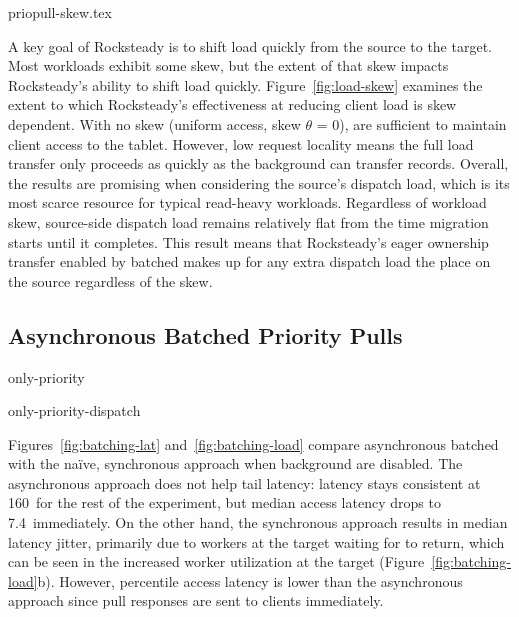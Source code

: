 

%

 {priopull-skew.tex}

A key goal of Rocksteady is to shift load quickly from the source to the
target. Most workloads exhibit some skew, but the extent of that skew impacts
Rocksteady's ability to shift load quickly. Figure~\ref{fig:load-skew}
examines the extent to which Rocksteady's effectiveness at reducing client load
is skew dependent. With no skew (uniform access, skew $\theta$ = 0), \priopulls are
sufficient to maintain client access to the tablet. However, low request locality
means the full load transfer only proceeds as quickly as the background
\pulls
can transfer records.  Overall, the results are promising when considering the
source's dispatch load, which is its most scarce resource for typical
read-heavy workloads. Regardless of workload skew, source-side dispatch load
remains relatively flat from the time migration starts until it completes.
This result means that Rocksteady's eager ownership transfer enabled by
batched \priopulls makes up for any extra dispatch load the \pulls place
on the source regardless of the skew.


\subsection{Asynchronous Batched Priority Pulls}
\label{sec:eval-priopulls}

 {only-priority}

 {only-priority-dispatch}

Figures~\ref{fig:batching-lat} and~\ref{fig:batching-load} compare
asynchronous batched \priopulls with the na\"{i}ve, synchronous approach
when background \pulls are disabled. The asynchronous
approach does not help tail latency:
\nnnth latency stays consistent at 160~\us for the rest of the
experiment, but median access latency drops to 7.4~\us immediately.
On the other hand, the synchronous approach results in
median latency jitter,
primarily due to workers at the target waiting for \priopulls to return, which
can be seen in the increased worker utilization at the target
(Figure~\ref{fig:batching-load}b).  However, \nnnth percentile access latency
is lower than the asynchronous approach since pull responses are sent to
clients immediately.

